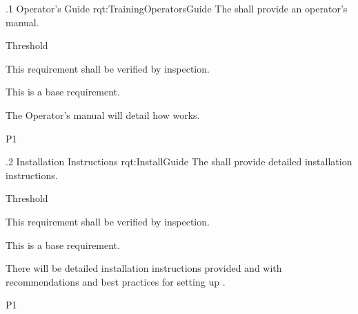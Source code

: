 \ONERQMTV
{\RqtNumberBase.1}
{Operator's Guide}
{rqt:TrainingOperatorsGuide}
{The \ThisSys shall provide an operator's manual.}
{
	\item [All Phases] Threshold
}
{This requirement shall be verified by inspection.}
{
\item [N/A] This is a base requirement.
}
{
	\item The Operator's manual will detail how \ThisSys works.
}
{P1}

\ONERQMTV
{\RqtNumberBase.2}
{Installation Instructions}
{rqt:InstallGuide}
{The \ThisSys shall provide detailed installation instructions.}
{
	\item [All Phases] Threshold
}
{This requirement shall be verified by inspection.}
{
\item [N/A] This is a base requirement.
}
{
	\item There will be detailed installation instructions provided and with recommendations and best practices for setting up \ThisSys.
}
{P1}

